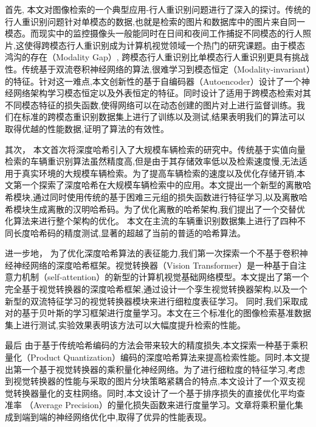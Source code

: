 首先, 本文对图像检索的一个典型应用-行人重识别问题进行了深入的探讨。传统的行人重识别问题针对单模态的数据,也就是检索的图片和数据库中的图片来自同一模态。而现实中的监控摄像头一般能同时在日间和夜间工作捕捉不同模态的行人照片,这使得跨模态行人重识别成为计算机视觉领域一个热门的研究课题。由于模态鸿沟的存在（Modality Gap）, 跨模态行人重识别比单模态行人重识别更具有挑战性。传统基于双流卷积神经网络的算法,很难学习到模态恒定（Modality-invariant）的特征。针对这一难点,本文创新性的基于自编码器（Autoencoder）设计了一个神经网络架构学习模态恒定以及外表恒定的特征。同时设计了适用于跨模态检索对其不同模态特征的损失函数,使得网络可以在动态创建的图片对上进行监督训练。我们在标准的跨模态重识别数据集上进行了训练以及测试,结果表明我们的算法可以取得优越的性能数据,证明了算法的有效性。 \par
其次， 本文首次将深度哈希引入了大规模车辆检索的研究中。传统基于实值向量检索的车辆重识别算法虽然精度高,但是由于其存储效率低以及检索速度慢,无法适用于真实环境的大规模车辆检索。为了提高车辆检索的速度以及优化存储开销,本文第一个探索了深度哈希在大规模车辆检索中的应用。本文提出一个新型的离散哈希模块,通过同时使用传统的基于困难三元组的损失函数进行特征学习,以及离散哈希模块生成离散的汉明哈希码。为了优化离散的哈希架构,我们提出了一个交替优化算法来进行整个架构的优化。 本文在主流的车辆重识别数据集上进行了四种不同长度哈希码的精度测试,显著的超越了当前的普适的哈希算法。 \par
进一步地， 为了优化深度哈希算法的表征能力,我们第一次探索一个不基于卷积神经神经网络的深度哈希框架。视觉转换器（Vision Transformer）是一种基于自注意力机制（self-attention）的新型的计算机视觉基础网络模型。本文提出了第一个完全基于视觉转换器的深度哈希框架,通过设计一个孪生视觉转换器架构,以及一个新型的双流特征学习的视觉转换器模块来进行细粒度表征学习。 同时,我们采取成对的基于贝叶斯的学习框架进行度量学习。本文在三个标准化的图像检索基准数据集上进行测试,实验效果表明该方法可以大幅度提升检索的性能。 \par
最后 由于基于传统哈希编码的方法会带来较大的精度损失,本文探索一种基于乘积量化（Product Quantization）编码的深度哈希算法来提高检索性能。同时,本文提出第一个基于视觉转换器的乘积量化神经网络。为了进行细粒度的特征学习,考虑到视觉转换器的性能与采取的图片分块策略紧耦合的特点,本文设计了一个双支视觉转换器量化的支柱网络。同时,本文设计了一个基于排序损失的直接优化平均查准率 （Average Precision）的量化损失函数来进行度量学习。文章将乘积量化集成到端到端的神经网络优化中,取得了优异的性能表现。

